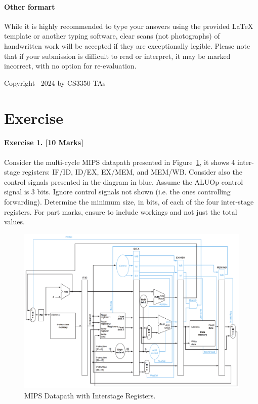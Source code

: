 \documentclass[12pt, a4paper]{article}
\begin{document}
\paragraph{Other formart} While it is highly recommended to type your answers using the provided LaTeX template or another typing software, clear scans (not photographs) of handwritten work will be accepted if they are exceptionally legible. Please note that if your submission is difficult to read or interpret, it may be marked incorrect, with no option for re-evaluation.


\vfill
\hfill Copyright \textcopyright\ 2024 by CS3350 TAs

\newpage

\section*{Exercise}
\paragraph{Exercise 1. [10 Marks]} Consider the multi-cycle MIPS datapath presented in Figure~\ref{fig:cpu_big}, it shows 4 inter-stage registers: IF/ID, ID/EX, EX/MEM, and MEM/WB. Consider also the control signals presented in the diagram in blue. Assume the ALUOp control signal is 3 bits. Ignore control signals not shown (i.e. the ones controlling forwarding). Determine the minimum size, in bits, of each of the four inter-stage registers. For part marks, ensure to include workings and not just the total values.

\begin{figure}[h]
  \centering
  \includegraphics[width=1.0\textwidth]{cpu_big.jpg}
  \caption{MIPS Datapath with Interstage Registers.}
  \label{fig:cpu_big}
\end{figure}
\end{document}
